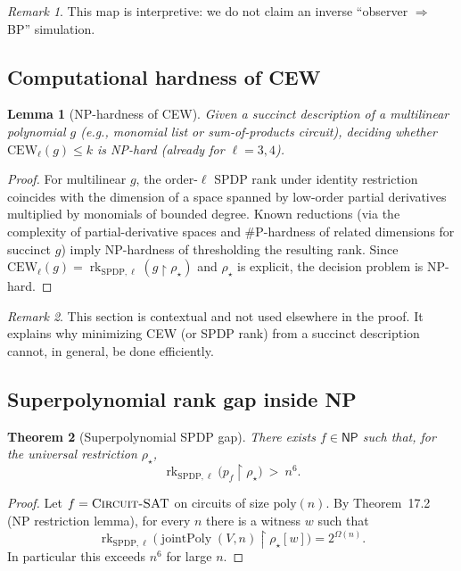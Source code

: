 \documentclass[12pt]{article}
\newtheorem{theorem}{Theorem}
\newtheorem{lemma}[theorem]{Lemma}
\theoremstyle{definition}
\theoremstyle{definition}
\theoremstyle{remark}
\newtheorem{remark}{Remark}
\theoremstyle{remark}
\begin{document}
\begin{remark}
This map is interpretive: we do not claim an inverse ``observer $\Rightarrow$ BP'' simulation.
\end{remark}

\subsection{Computational hardness of CEW}

\begin{lemma}[NP-hardness of CEW]\label{lem:cew-hardness}
Given a succinct description of a multilinear polynomial $g$ (e.g., monomial list or sum-of-products circuit), deciding whether $\mathrm{CEW}_\ell(g)\le k$ is NP-hard (already for $\ell=3,4$).
\end{lemma}

\begin{proof}
For multilinear $g$, the order-$\ell$ SPDP rank under identity restriction coincides with the dimension of a space spanned by low-order partial derivatives multiplied by monomials of bounded degree. Known reductions (via the complexity of partial-derivative spaces and \#P-hardness of related dimensions for succinct $g$) imply NP-hardness of thresholding the resulting rank. Since $\mathrm{CEW}_\ell(g)=\operatorname{rk}_{\mathrm{SPDP},\ell}(g\upharpoonright\rho_\star)$ and $\rho_\star$ is explicit, the decision problem is NP-hard.
\end{proof}

\begin{remark}
This section is contextual and not used elsewhere in the proof. It explains why minimizing CEW (or SPDP rank) from a succinct description cannot, in general, be done efficiently.
\end{remark}

\subsection{Superpolynomial rank gap inside NP}

\begin{theorem}[Superpolynomial SPDP gap]\label{thm:superpoly-spdp-gap}
There exists $f\in\mathsf{NP}$ such that, for the universal restriction $\rho_\star$,
\[
\operatorname{rk}_{\mathrm{SPDP},\ell}\!\big(p_f\upharpoonright\rho_\star\big)\ >\ n^6.
\]
\end{theorem}

\begin{proof}
Let $f=\textsc{Circuit-SAT}$ on circuits of size $\mathrm{poly}(n)$. By Theorem~17.2 (NP restriction lemma), for every $n$ there is a witness $w$ such that
\[
\operatorname{rk}_{\mathrm{SPDP},\ell}\!\big(\operatorname{jointPoly}(V,n)\upharpoonright\rho_\star[w]\big)=2^{\Omega(n)}.
\]
In particular this exceeds $n^6$ for large $n$.
\end{proof}
\end{document}
